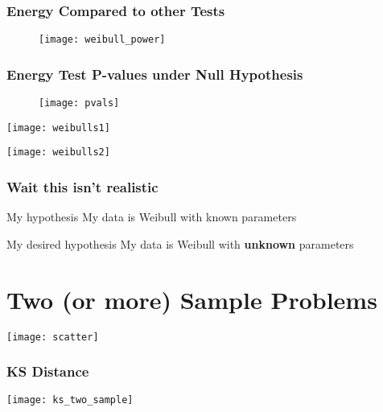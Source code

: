 \documentclass[presentation]{beamer}
\begin{document}
\begin{frame}
  \frametitle{Energy Compared to other Tests}
  \begin{figure}
    \centering
    \texttt{[image: weibull\_power]}
  \end{figure}
\end{frame}

\begin{frame}
  \frametitle{Energy Test P-values under Null Hypothesis}
  \begin{figure}
    \centering
    \texttt{[image: pvals]}
  \end{figure}
\end{frame}


\begin{frame}
  \texttt{[image: weibulls1]} 
\end{frame}


\begin{frame}
  \texttt{[image: weibulls2]} 
\end{frame}

\begin{frame}
  \frametitle{Wait this isn't realistic}
  \begin{block}{My hypothesis}
    My data is Weibull with known parameters
  \end{block}
  \vskip 0.5in
  \begin{block}{My desired hypothesis}
    My data is Weibull with \textbf{unknown} parameters
  \end{block}
\end{frame}

\section{Two (or more) Sample Problems}

\begin{frame}
  \texttt{[image: scatter]}
\end{frame}

\begin{frame}
  \frametitle{KS Distance}
  \texttt{[image: ks\_two\_sample]}
\end{frame}
\end{document}
